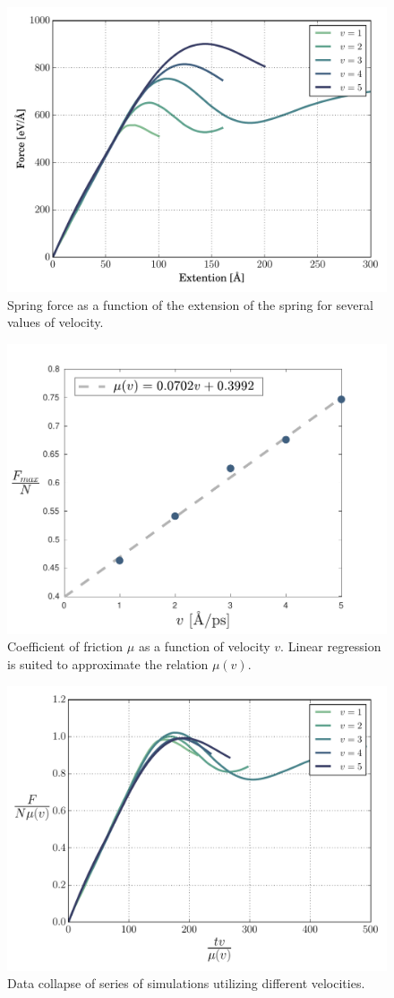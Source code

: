 \documentclass[twoside,english]{uiofysmaster}
\begin{document}
\begin{figure}[H]
\centering
\includegraphics[width=0.7\linewidth]{figures/friction/scalingCoeffisient/UnScaledExtention}
\caption{Spring force as a function of the extension of the spring for several values of velocity.}
\label{fig:springUnScaledExtension}
\end{figure}

\begin{figure}[H]
\centering
\includegraphics[width=0.7\linewidth]{figures/friction/scalingCoeffisient/u(v)}
\caption{Coefficient of friction $\mu$ as a function of velocity $v$. Linear regression is suited to approximate the relation $\mu(v)$.}
\label{fig:springUvsV}
\end{figure}

\begin{figure}[H]
\centering
\includegraphics[width=0.7\linewidth]{figures/friction/scalingCoeffisient/dataCollapse}
\caption{Data collapse of series of simulations utilizing different velocities.}
\label{fig:springDataCollapse}
\end{figure}
\end{document}
